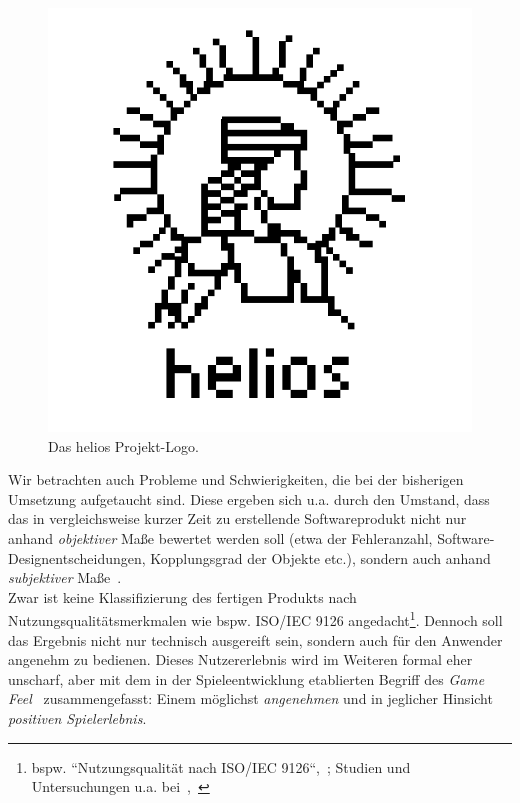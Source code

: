 \begin{figure}[!h]
    \centering
    \includegraphics[width=0.5\columnwidth]{img/helios_logo}
    \caption{Das helios Projekt-Logo.}
    \label{fig:helios_logo}
\end{figure}


Wir betrachten auch Probleme und Schwierigkeiten, die bei der bisherigen Umsetzung aufgetaucht sind.
Diese ergeben sich u.a. durch den Umstand, dass das in vergleichsweise kurzer Zeit zu erstellende Softwareprodukt nicht nur anhand \textit{objektiver} Maße bewertet werden soll (etwa der Fehleranzahl, Software-Designentscheidungen, Kopplungsgrad der Objekte etc.), sondern auch anhand \textit{subjektiver} Maße~\cite[385]{Bal08}.\\
Zwar ist keine Klassifizierung des fertigen Produkts nach Nutzungsqualitätsmerkmalen wie bspw. ISO/IEC 9126 angedacht\footnote{bspw. ``Nutzungsqualität nach ISO/IEC 9126``,~\cite[466]{Bal08}; Studien und Untersuchungen u.a. bei~\cite[]{AZMK17},~\cite[]{Ber10}}.
Dennoch soll das Ergebnis nicht nur technisch ausgereift sein, sondern auch für den Anwender angenehm zu bedienen.
Dieses Nutzererlebnis wird im Weiteren formal eher unscharf, aber mit dem in der Spieleentwicklung etablierten Begriff des \textit{Game Feel}~\cite[]{Swi08} zusammengefasst: Einem möglichst \textit{angenehmen} und in jeglicher Hinsicht \textit{positiven Spielerlebnis}.


